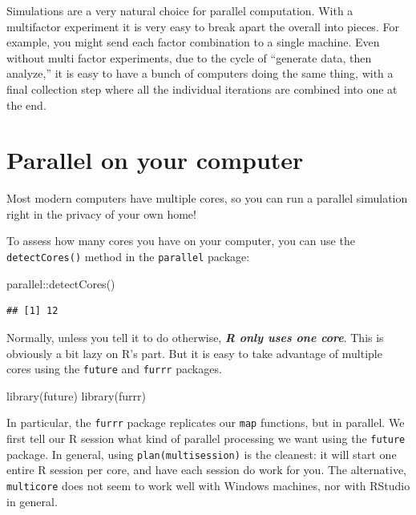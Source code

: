 \documentclass[
]{book}
\newenvironment{Shaded}{\begin{snugshade}}{\end{snugshade}}
\newcommand{\FunctionTok}[1]{\textcolor[rgb]{0.00,0.00,0.00}{#1}}
\newcommand{\NormalTok}[1]{#1}
\newcommand{\SpecialCharTok}[1]{\textcolor[rgb]{0.00,0.00,0.00}{#1}}
\begin{document}
Simulations are a very natural choice for parallel computation.
With a multifactor experiment it is very easy to break apart the overall into pieces.
For example, you might send each factor combination to a single machine.
Even without multi factor experiments, due to the cycle of ``generate data, then analyze,'' it is easy to have a bunch of computers doing the same thing, with a final collection step where all the individual iterations are combined into one at the end.

\hypertarget{parallel-on-your-computer}{%
\section{Parallel on your computer}\label{parallel-on-your-computer}}

Most modern computers have multiple cores, so you can run a parallel simulation right in the privacy of your own home!

To assess how many cores you have on your computer, you can use the \texttt{detectCores()} method in the \texttt{parallel} package:

\begin{Shaded}
\begin{Highlighting}[]
\NormalTok{parallel}\SpecialCharTok{::}\FunctionTok{detectCores}\NormalTok{()}
\end{Highlighting}
\end{Shaded}

\begin{verbatim}
## [1] 12
\end{verbatim}

Normally, unless you tell it to do otherwise, \textbf{\emph{R only uses one core}}.
This is obviously a bit lazy on R's part.
But it is easy to take advantage of multiple cores using the \texttt{future} and \texttt{furrr} packages.

\begin{Shaded}
\begin{Highlighting}[]
\FunctionTok{library}\NormalTok{(future)}
\FunctionTok{library}\NormalTok{(furrr)}
\end{Highlighting}
\end{Shaded}

In particular, the \texttt{furrr} package replicates our \texttt{map} functions, but in parallel.
We first tell our R session what kind of parallel processing we want using the \texttt{future} package.
In general, using \texttt{plan(multisession)} is the cleanest: it will start one entire R session per core, and have each session do work for you.
The alternative, \texttt{multicore} does not seem to work well with Windows machines, nor with RStudio in general.
\end{document}

